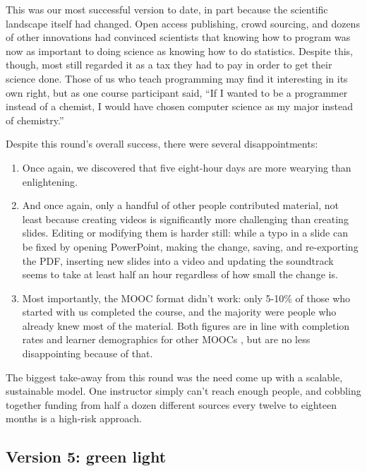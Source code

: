 \documentclass[10pt,a4paper,twocolumn]{article}
\begin{document}
This was our most successful version to date, in part because the
scientific landscape itself had changed. Open access publishing, crowd
sourcing, and dozens of other innovations had convinced scientists
that knowing how to program was now as important to doing science as
knowing how to do statistics. Despite this, though, most still
regarded it as a tax they had to pay in order to get their science
done. Those of us who teach programming may find it interesting in its
own right, but as one course participant said, ``If I wanted to be a
programmer instead of a chemist, I would have chosen computer science
as my major instead of chemistry.''

Despite this round's overall success, there were several
disappointments:

\begin{enumerate}

\item
  Once again, we discovered that five eight-hour days are more wearying
  than enlightening.

\item
  And once again, only a handful of other people contributed material,
  not least because creating videos is significantly more challenging
  than creating slides. Editing or modifying them is harder still:
  while a typo in a slide can be fixed by opening PowerPoint, making
  the change, saving, and re-exporting the PDF, inserting new slides
  into a video and updating the soundtrack seems to take at least half
  an hour regardless of how small the change is.

\item
  Most importantly, the MOOC format didn't work: only 5-10\% of those
  who started with us completed the course, and the majority were
  people who already knew most of the material. Both figures are in
  line with completion rates and learner demographics for other MOOCs
  \cite{jordan2013}, but are no less disappointing because of that.

\end{enumerate}

The biggest take-away from this round was the need come up with a
scalable, sustainable model. One instructor simply can't reach enough
people, and cobbling together funding from half a dozen different
sources every twelve to eighteen months is a high-risk approach.

\subsection*{Version 5: green light}
\end{document}
